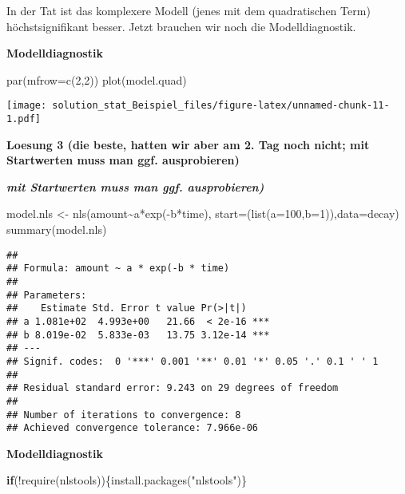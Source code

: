 \documentclass[
]{article}
\newenvironment{Shaded}{\begin{snugshade}}{\end{snugshade}}
\newcommand{\AttributeTok}[1]{\textcolor[rgb]{0.77,0.63,0.00}{#1}}
\newcommand{\ControlFlowTok}[1]{\textcolor[rgb]{0.13,0.29,0.53}{\textbf{#1}}}
\newcommand{\DecValTok}[1]{\textcolor[rgb]{0.00,0.00,0.81}{#1}}
\newcommand{\FunctionTok}[1]{\textcolor[rgb]{0.00,0.00,0.00}{#1}}
\newcommand{\NormalTok}[1]{#1}
\newcommand{\OtherTok}[1]{\textcolor[rgb]{0.56,0.35,0.01}{#1}}
\newcommand{\SpecialCharTok}[1]{\textcolor[rgb]{0.00,0.00,0.00}{#1}}
\newcommand{\StringTok}[1]{\textcolor[rgb]{0.31,0.60,0.02}{#1}}
\begin{document}
In der Tat ist das komplexere Modell (jenes mit dem quadratischen Term)
höchstsignifikant besser. Jetzt brauchen wir noch die Modelldiagnostik.

\textbf{Modelldiagnostik}

\begin{Shaded}
\begin{Highlighting}[]
\FunctionTok{par}\NormalTok{(}\AttributeTok{mfrow=}\FunctionTok{c}\NormalTok{(}\DecValTok{2}\NormalTok{,}\DecValTok{2}\NormalTok{))}
\FunctionTok{plot}\NormalTok{(model.quad)}
\end{Highlighting}
\end{Shaded}

\texttt{[image: solution\_stat\_Beispiel\_files/figure-latex/unnamed-chunk-11-1.pdf]}

\textbf{Loesung 3 (die beste, hatten wir aber am 2. Tag noch nicht; mit
Startwerten muss man ggf. ausprobieren)}

\emph{\textbf{mit Startwerten muss man ggf. ausprobieren)}}

\begin{Shaded}
\begin{Highlighting}[]
\NormalTok{model.nls }\OtherTok{\textless{}{-}} \FunctionTok{nls}\NormalTok{(amount}\SpecialCharTok{\textasciitilde{}}\NormalTok{a}\SpecialCharTok{*}\FunctionTok{exp}\NormalTok{(}\SpecialCharTok{{-}}\NormalTok{b}\SpecialCharTok{*}\NormalTok{time), }\AttributeTok{start=}\NormalTok{(}\FunctionTok{list}\NormalTok{(}\AttributeTok{a=}\DecValTok{100}\NormalTok{,}\AttributeTok{b=}\DecValTok{1}\NormalTok{)),}\AttributeTok{data=}\NormalTok{decay)}
\FunctionTok{summary}\NormalTok{(model.nls)}
\end{Highlighting}
\end{Shaded}

\begin{verbatim}
## 
## Formula: amount ~ a * exp(-b * time)
## 
## Parameters:
##    Estimate Std. Error t value Pr(>|t|)    
## a 1.081e+02  4.993e+00   21.66  < 2e-16 ***
## b 8.019e-02  5.833e-03   13.75 3.12e-14 ***
## ---
## Signif. codes:  0 '***' 0.001 '**' 0.01 '*' 0.05 '.' 0.1 ' ' 1
## 
## Residual standard error: 9.243 on 29 degrees of freedom
## 
## Number of iterations to convergence: 8 
## Achieved convergence tolerance: 7.966e-06
\end{verbatim}

\textbf{Modelldiagnostik}

\begin{Shaded}
\begin{Highlighting}[]
\ControlFlowTok{if}\NormalTok{(}\SpecialCharTok{!}\FunctionTok{require}\NormalTok{(nlstools))\{}\FunctionTok{install.packages}\NormalTok{(}\StringTok{"nlstools"}\NormalTok{)\}}
\end{Highlighting}
\end{Shaded}
\end{document}
